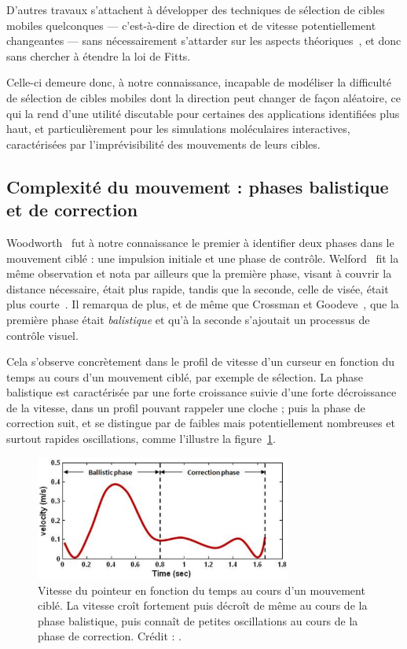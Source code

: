 	D'autres travaux s'attachent à développer des techniques de sélection de cibles mobiles \og quelconques \fg{} --- c'est-à-dire de direction et de vitesse potentiellement changeantes --- sans nécessairement s'attarder sur les aspects théoriques~\cite{hasan2011comet, ortega2013hook}, et donc sans chercher à étendre la loi de Fitts.
	
	Celle-ci demeure donc, à notre connaissance, incapable de modéliser la difficulté de sélection de cibles mobiles dont la direction peut changer de façon aléatoire, ce qui la rend d'une utilité discutable pour certaines des applications identifiées plus haut, et particulièrement pour les simulations moléculaires interactives, caractérisées par l'imprévisibilité des mouvements de leurs cibles.
	
	\subsection{Complexité du mouvement : phases balistique et de correction}
	Woodworth~\cite{woodworth1899accuracy} fut à notre connaissance le premier à identifier deux phases dans le mouvement ciblé : une impulsion initiale et une phase de contrôle. Welford~\cite{welford1968fundamentals} fit la même observation et nota par ailleurs que la première phase, visant à couvrir la distance nécessaire, était plus rapide, tandis que la seconde, celle de visée, était plus courte~\cite{mackenzie1987three}. Il remarqua de plus, et de même que Crossman et Goodeve~\cite{crossman1983feedback}, que la première phase était \emph{balistique} et qu'à la seconde s'ajoutait un processus de contrôle visuel.
	
	Cela s'observe concrètement dans le profil de vitesse d'un curseur en fonction du temps au cours d'un mouvement ciblé, par exemple de sélection. La phase balistique est caractérisée par une forte croissance suivie d'une forte décroissance de la vitesse, dans un profil pouvant rappeler une cloche ; puis la phase de correction suit, et se distingue par de faibles mais potentiellement nombreuses et surtout rapides oscillations, comme l'illustre la figure~\ref{fig:ballistic}.
	
	\begin{figure}[!htb]
		\centering
		\includegraphics[width=0.75\textwidth]{figures/ch2/ballistic}
		\caption[Profil de vitesse -- phases balistique et de correction]{Vitesse du pointeur en fonction du temps au cours d'un mouvement ciblé. La vitesse croît fortement puis décroît de même au cours de la phase balistique, puis connaît de petites oscillations au cours de la phase de correction. Crédit : \cite{liu2009designing}.}
		\label{fig:ballistic}
	\end{figure}
	
